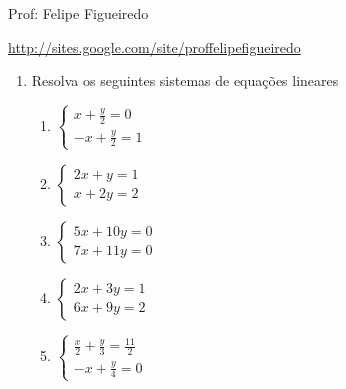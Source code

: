 \documentclass[a4paper]{article}
\begin{document}
\parbox[c]{.825\textwidth}{\raggedright%
{Prof: Felipe Figueiredo\par}
{\url{http://sites.google.com/site/proffelipefigueiredo}}

\vspace{1cm}
}



\begin{enumerate}
\item Resolva os seguintes sistemas de equações lineares

  \begin{enumerate}
  \item $\left\{
      \begin{array}{ll}  
        x + \frac{y}{2} = 0\\
        -x + \frac{y}{2} =1 
      \end{array}
    \right.$
    
  \item $\left\{
      \begin{array}{ll}  
        2x +y =1\\
        x + 2y = 2
      \end{array}
    \right.$

  \item $\left\{
      \begin{array}{ll}  
        5x  + 10y = 0\\
        7x + 11y = 0
      \end{array}
    \right.$

  \item $\left\{
      \begin{array}{ll}  
        2x + 3y = 1\\
        6x +9y = 2
      \end{array}
    \right.$

  \item $\left\{
      \begin{array}{ll}  
        \frac{x}{2} + \frac{y}{3} = \frac{11}{2}\\
        -x + \frac{y}{4} = 0
      \end{array}
    \right.$


\end{enumerate}
\end{enumerate}
\end{document}
